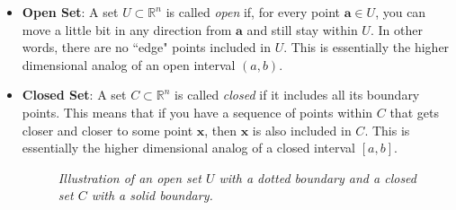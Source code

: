 \begin{itemize}
    \item \textbf{Open Set}:  A set \( U \subset \mathbb{R}^n \) is called \textit{open} if, for every point \( \mathbf{a} \in U \), you can move a little bit in any direction from \( \mathbf{a} \) and still stay within \( U \). In other words, there are no ``edge" points included in \( U \). This is essentially the higher dimensional analog of an open interval $(a,b)$.
    
    \item \textbf{Closed Set}:  A set \( C \subset \mathbb{R}^n \) is called \textit{closed} if it includes all its boundary points. This means that if you have a sequence of points within \( C \) that gets closer and closer to some point \( \mathbf{x} \), then \( \mathbf{x} \) is also included in \( C \). This is essentially the higher dimensional analog of a closed interval $[a,b]$.


\begin{figure}[H]
\centering
{}
\caption{\textit{Illustration of an open set $U$ with a dotted boundary and a closed set $C$ with a solid boundary.}}
\end{figure}


\end{itemize}

